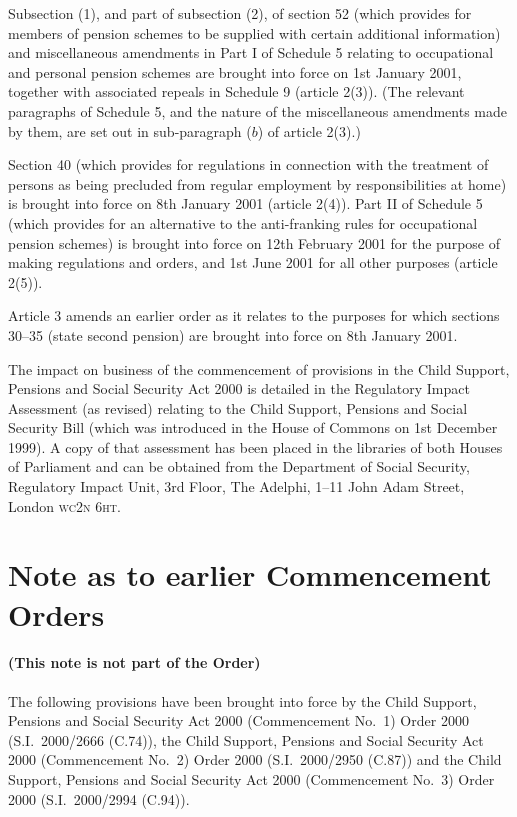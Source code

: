 \documentclass[12pt,a4paper]{article}
\begin{document}
Subsection (1), and part of subsection (2), of section 52 (which provides for members of pension schemes to be supplied with certain additional information) and miscellaneous amendments in Part I of Schedule 5 relating to occupational and personal pension schemes are brought into force on 1st January 2001, together with associated repeals in Schedule 9 (article 2(3)). (The relevant paragraphs of Schedule 5, and the nature of the miscellaneous amendments made by them, are set out in sub-paragraph ($b$)  of article 2(3).)

Section 40 (which provides for regulations in connection with the treatment of persons as being precluded from regular employment by responsibilities at home) is brought into force on 8th January 2001 (article 2(4)). Part II of Schedule 5 (which provides for an alternative to the anti-franking rules for occupational pension schemes) is brought into force on 12th February 2001 for the purpose of making regulations and orders, and 1st June 2001 for all other purposes (article 2(5)).

Article 3 amends an earlier order as it relates to the purposes for which sections 30--35 (state second pension) are brought into force on 8th January 2001.

The impact on business of the commencement of provisions in the Child Support, Pensions and Social Security Act 2000 is detailed in the Regulatory Impact Assessment (as revised) relating to the Child Support, Pensions and Social Security Bill (which was introduced in the House of Commons on 1st December 1999). A copy of that assessment has been placed in the libraries of both Houses of Parliament and can be obtained from the Department of Social Security, Regulatory Impact Unit, 3rd Floor, The Adelphi, 1--11 John Adam Street, London \textsc{\lowercase{WC2N 6HT}}. 

\part{Note as to earlier Commencement Orders}

\renewcommand\parthead{--- Note as to earlier Commencement Orders}

\subsection*{(This note is not part of the Order)}

The following provisions have been brought into force by the Child Support, Pensions and Social Security Act 2000 (Commencement No.\ 1) Order 2000 (S.I.\ 2000/2666 (C.74)), the Child Support, Pensions and Social Security Act 2000 (Commencement No.\ 2) Order 2000 (S.I.\ 2000/2950 (C.87)) and the Child Support, Pensions and Social Security Act 2000 (Commencement No.\ 3) Order 2000 (S.I.\ 2000/2994 (C.94)).
\end{document}
